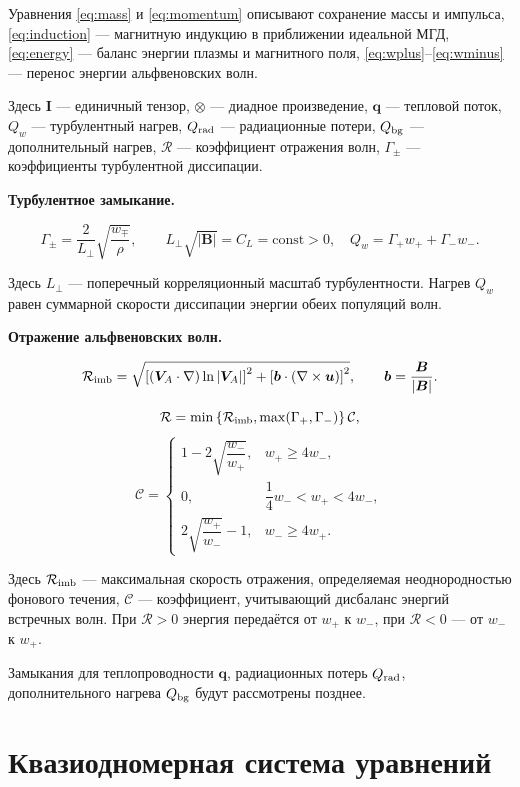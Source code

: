 \documentclass[12pt,a4paper]{article}
\newcommand{\vb}[1]{\bm{#1}}
\newcommand{\B}{\vb{B}}
\newcommand{\uvec}{\vb{u}}
\newcommand{\VA}{\vb{V}_A}
\newcommand{\Rref}{\mathcal R}
\newcommand{\Id}{\mathbf I}
\begin{document}
Уравнения \eqref{eq:mass} и \eqref{eq:momentum} описывают
сохранение массы и импульса, \eqref{eq:induction} ---
магнитную индукцию в приближении идеальной МГД,
\eqref{eq:energy} --- баланс энергии плазмы и магнитного поля,
\eqref{eq:wplus}--\eqref{eq:wminus} --- перенос энергии
альфвеновских волн.

Здесь $\Id$ --- единичный тензор,
$\otimes$ --- диадное произведение,
$\vb{q}$ --- тепловой поток,
$Q_w$ --- турбулентный нагрев,
$Q_{\rm rad}$ --- радиационные потери,
$Q_{\rm bg}$ --- дополнительный нагрев,
$\Rref$ --- коэффициент отражения волн,
$\Gamma_\pm$ --- коэффициенты турбулентной диссипации.

\medskip
\noindent\textbf{Турбулентное замыкание.}

\[
\Gamma_\pm=\frac{2}{L_\perp}
\sqrt{\frac{w_\mp}{\rho}},
\qquad
L_\perp\sqrt{|\B|}=C_L=\mathrm{const}>0, \quad Q_w=\Gamma_+w_++\Gamma_-w_-. 
\]

Здесь $L_\perp$ --- поперечный корреляционный масштаб
турбулентности. Нагрев $Q_w$ равен суммарной скорости
диссипации энергии обеих популяций волн.

\medskip
\noindent\textbf{Отражение альфвеновских волн.}

\[
\mathcal R_{\rm imb}
=
\sqrt{
\left[(\VA\cdot\nabla)\ln|\VA|\right]^2
+
\left[\vb{b}\cdot(\nabla\times\uvec)\right]^2
},
\qquad
\vb{b}=\frac{\B}{|\B|}.
\]

\[
\Rref=
\min\left\{
\mathcal R_{\rm imb},
\max(\Gamma_+,\Gamma_-)
\right\}\mathcal C,
\]
\[
\mathcal C=
\begin{cases}
1-2\sqrt{\dfrac{w_-}{w_+}},
& w_+\geq 4w_-,\\[8pt]
0,
& \dfrac14w_-<w_+<4w_-,\\[8pt]
2\sqrt{\dfrac{w_+}{w_-}}-1,
& w_-\geq 4w_+.
\end{cases}
\]

Здесь $\mathcal R_{\rm imb}$ --- максимальная скорость
отражения, определяемая неоднородностью фонового течения,
$\mathcal C$ --- коэффициент, учитывающий дисбаланс
энергий встречных волн. При $\Rref>0$ энергия передаётся от $w_+$ к $w_-$,
при $\Rref<0$ --- от $w_-$ к $w_+$.

Замыкания для теплопроводности $\vb{q}$,
радиационных потерь $Q_{\rm rad}$,
дополнительного нагрева $Q_{\rm bg}$ будут рассмотрены позднее.


\section{Квазиодномерная система уравнений}
\label{sec:quasi1d}
\end{document}
